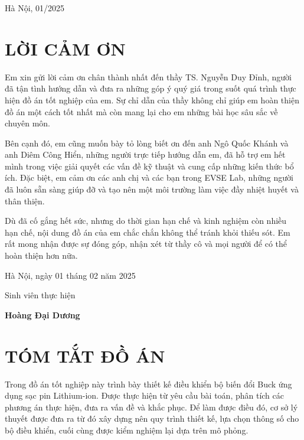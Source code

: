 \documentclass{thesis}
\begin{document}
\begin{center}
    \vspace{48pt}
    \fontsize{14pt}{0pt}\selectfont{} Hà Nội, 01/2025
\end{center}

\thispagestyle{empty}
    \newpage
        \clearpage
            \thispagestyle{empty}
                \cleardoublepage


                
\section*{LỜI CẢM ƠN}
    \thispagestyle{empty}
Em xin gửi lời cảm ơn chân thành nhất đến thầy TS. Nguyễn Duy Đỉnh, người đã tận tình hướng dẫn và đưa ra những góp ý quý giá trong suốt quá trình thực hiện đồ án tốt nghiệp của em. Sự chỉ dẫn của thầy không chỉ giúp em hoàn thiện đồ án một cách tốt nhất mà còn mang lại cho em những bài học sâu sắc về chuyên môn.

Bên cạnh đó, em cũng muốn bày tỏ lòng biết ơn đến anh Ngô Quốc Khánh và anh Diêm Công Hiển, những người trực tiếp hướng dẫn em, đã hỗ trợ em hết mình trong việc giải quyết các vấn đề kỹ thuật và cung cấp những kiến thức bổ ích. Đặc biệt, em cảm ơn các anh chị và các bạn trong EVSE Lab, những người đã luôn sẵn sàng giúp đỡ và tạo nên một môi trường làm việc đầy nhiệt huyết và thân thiện.

Dù đã cố gắng hết sức, nhưng do thời gian hạn chế và kinh nghiệm còn nhiều hạn chế, nội dung đồ án của em chắc chắn không thể tránh khỏi thiếu sót. Em rất mong nhận được sự đóng góp, nhận xét từ thầy cô và mọi người để có thể hoàn thiện hơn nữa.

\vspace{6pt}
    \hspace{7cm}Hà Nội, ngày 01 tháng 02 năm 2025
        
        \hspace{8.6cm} Sinh viên thực hiện      %

\vspace{2cm}
    \hspace{9.25cm}\textbf{Hoàng Đại Dương} %

\newpage %
    \thispagestyle{empty} 
        \clearpage
            \thispagestyle{empty}
                \cleardoublepage

\section*{TÓM TẮT ĐỒ ÁN}
    \thispagestyle{empty}
Trong đồ án tốt nghiệp này trình bày thiết kế điều khiển bộ biến đổi Buck ứng dụng sạc pin Lithium-ion. Được thực hiện từ yêu cầu bài toán, phân tích các phương án thực hiện, đưa ra
 vấn đề và khắc phục. Để làm được điều đó, cơ sở lý thuyết được đưa ra từ đó xây
 dựng nên quy trình thiết kế, lựa chọn thông số cho bộ điều khiển, cuối cùng được kiểm
 nghiệm lại dựa trên mô phỏng.
\end{document}
